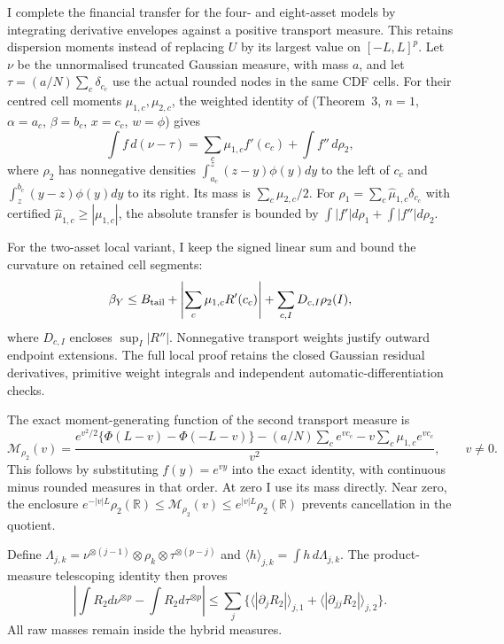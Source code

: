 \documentclass[11pt]{article}
\begin{document}
I complete the financial transfer for the four- and eight-asset models
by integrating derivative envelopes against a positive transport measure.
This retains dispersion moments instead of replacing $U$ by its largest
value on $[-L,L]^p$. Let $\nu$ be the unnormalised truncated Gaussian
measure, with mass $a$, and let $\tau=(a/N)\sum_c\delta_{c_c}$ use the
actual rounded nodes in the same CDF cells. For their centred cell moments
$\mu_{1,c},\mu_{2,c}$, the weighted identity of \citet{cerone2002}
(Theorem~3, $n=1$, $\alpha=a_c$, $\beta=b_c$, $x=c_c$, $w=\phi$) gives
\begin{equation}
 \int f\,d(\nu-\tau)=\sum_c\mu_{1,c}f'(c_c)
                         +\int f''\,d\rho_2,
\end{equation}
where $\rho_2$ has nonnegative densities
$\int_{a_c}^{z}(z-y)\phi(y)dy$ to the left of $c_c$ and
$\int_z^{b_c}(y-z)\phi(y)dy$ to its right. Its mass is
$\sum_c\mu_{2,c}/2$. For
$\rho_1=\sum_c\widehat\mu_{1,c}\delta_{c_c}$ with certified
$\widehat\mu_{1,c}\geq|\mu_{1,c}|$, the absolute transfer is bounded
by $\int|f'|d\rho_1+\int|f''|d\rho_2$.

For the two-asset local variant, I keep the signed linear sum and
bound the curvature on retained cell segments:
\begin{equation}
 \beta_Y\leq B_{\rm tail}+\left|\sum_c\mu_{1,c}R'(c_c)\right|
                    +\sum_{c,I}D_{c,I}\rho_2(I),
 \label{eq:reference-transfer}
\end{equation}
where $D_{c,I}$ encloses $\sup_I|R''|$. Nonnegative transport weights
justify outward endpoint extensions. The full local proof retains the
closed Gaussian residual derivatives, primitive weight integrals and
independent automatic-differentiation checks.

The exact moment-generating function of the second transport measure is
\begin{equation}
 \mathcal M_{\rho_2}(v)=\frac{
 e^{v^2/2}\{\Phi(L-v)-\Phi(-L-v)\}
 -(a/N)\sum_c e^{vc_c}-v\sum_c\mu_{1,c}e^{vc_c}}{v^2},
 \qquad v\ne0.
 \label{eq:positive-transport-mgf}
\end{equation}
This follows by substituting $f(y)=e^{vy}$ into the exact identity,
with continuous minus rounded measures in that order. At zero I use its
mass directly. Near zero, the enclosure
$e^{-|v|L}\rho_2(\mathbb R)\leq\mathcal M_{\rho_2}(v)
\leq e^{|v|L}\rho_2(\mathbb R)$ prevents cancellation in the quotient.

Define
$\Lambda_{j,k}=\nu^{\otimes(j-1)}\otimes\rho_k
\otimes\tau^{\otimes(p-j)}$ and
$\langle h\rangle_{j,k}=\int h\,d\Lambda_{j,k}$.
The product-measure telescoping identity then proves
\begin{equation}
 \left|\int R_2d\nu^{\otimes p}-\int R_2d\tau^{\otimes p}\right|
 \leq\sum_j\{\langle|\partial_jR_2|\rangle_{j,1}
                   +\langle|\partial_{jj}R_2|\rangle_{j,2}\}.
 \label{eq:positive-tensor-transfer}
\end{equation}
All raw masses remain inside the hybrid measures.
\end{document}
